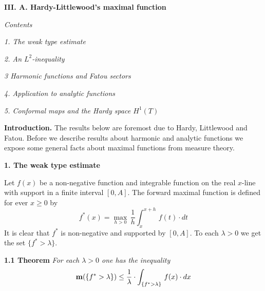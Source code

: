 






%

\centerline{\bf\large {III. A. Hardy-Littlewood's maximal function}}
\bigskip

\centerline{\emph{Contents}}

\bigskip

\noindent
\emph{1. The weak type estimate}


\bigskip

\noindent
\emph{2.  An $L^2$-inequality}

\bigskip

\noindent
\emph{3 Harmonic functions  and Fatou sectors}



\bigskip

\noindent
\emph{4. Application to analytic functions}



\bigskip

\noindent
\emph { 5. Conformal maps and the Hardy space
$H^1(T)$}



\bigskip

\noindent
{\bf{Introduction.}}
The results below are foremost due to Hardy, Littlewood and Fatou.
Before we describe results about harmonic and analytic functions
we expose some general facts about maximal functions from measure theory.

\medskip


\centerline{\bf{1. The weak type estimate}}
\bigskip



\noindent
Let $f(x)$ be a non-negative function and integrable function
on the real $x$-line
with support in a finite interval $[0,A]$.
The  forward maximal function  is defined for ever $x\geq 0$ by
\[
 f^*(x)=\max_{h>0}\, \frac{1}{h}\int_x^{x+h}\, f(t)\cdot dt
\]
It is clear that $f^*$ is non-negative and supported by $[0,A]$.
To each $\lambda>0$ we get the
set $\{f^*>\lambda\}$. 
\medskip

\noindent
{\bf{1.1 Theorem}}
\emph{For each $\lambda>0$ one has the inequality}
\[ 
{\bf{m}}(\{f^*>\lambda\})\leq \frac{1}{\lambda}\cdot
\int_{\{f^*>\lambda\}}\, f(x)\cdot dx
\]


